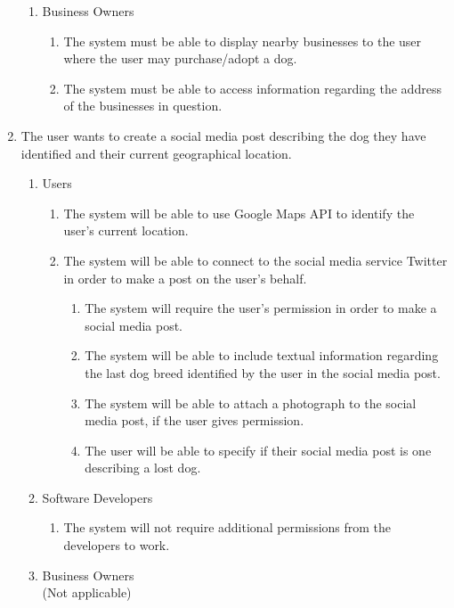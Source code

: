 \documentclass[]{article}
\begin{document}
\begin{enumerate}[{BE}1.]
\begin{enumerate}[{VP2}.1]
		\item Business Owners
		\begin{enumerate}
			\item The system must be able to display nearby businesses to the user where the user may purchase/adopt a dog.
			\item The system must be able to access information regarding the address of the businesses in question.
		\end{enumerate}
	\end{enumerate}
	\item The user wants to create a social media post describing the dog they have identified and their current geographical location.
	\begin{enumerate}[{VP3}.1]
		\item Users
		\begin{enumerate}
			\item The system will be able to use Google Maps API to identify the user's current location.
			\item The system will be able to connect to the social media service Twitter in order to make a post on the user's behalf.
			\begin{enumerate}[{ii}.i]
				\item The system will require the user's permission in order to make a social media post.
				\item The system will be able to include textual information regarding the last dog breed identified by the user in the social media post.
				\item The system will be able to attach a photograph to the social media post, if the user gives permission.
				\item The user will be able to specify if their social media post is one describing a lost dog.
			\end{enumerate}
		\end{enumerate}
		\item Software Developers
		\begin{enumerate}
			\item The system will not require additional permissions from the developers to work.
		\end{enumerate}
		\item Business Owners\\(Not applicable)
	\end{enumerate}
\end{enumerate}
\end{document}

